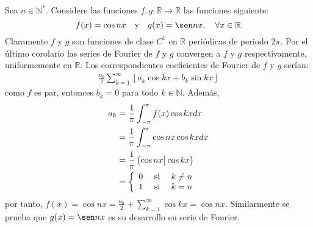 \documentclass[12pt]{report}
\theoremstyle{largebreak}
\newcommand\cf[3]{\ensuremath{#1:#2\rightarrow#3}}
\newcommand\pint[2]{\ensuremath{\left(#1\big| #2\right)}}
\begin{document}
    \begin{exa}
        Sea $n\in\mathbb{N}^*$. Considere las funciones $\cf{f,g}{\mathbb{R}}{\mathbb{R}}$ las funciones siguiente:
        \begin{equation*}
            f(x)=\cos nx\quad\textup{y}\quad g(x)=\sen nx,\quad\forall x\in\mathbb{R}
        \end{equation*}
        Claramente $f$ y $g$ son funciones de clase $C^1$ en $\mathbb{R}$ periódicas de periodo $2\pi$. Por el último corolario las series de Fourier de $f$ y $g$ convergen a $f$ y $g$ respectivamente, uniformemente en $\mathbb{R}$. Los correspondientes coeficientes de Fourier de $f$ y $g$ serían:
        \begin{equation*}
            \begin{split}
                \frac{a_0}{2}\sum_{ k=1}^\infty\left[a_k\cos kx+b_k\sin kx \right]
            \end{split}
        \end{equation*}
        como $f$ es par, entonces $b_k=0$ para todo $k\in\mathbb{N}$. Además,
        \begin{equation*}
            \begin{split}
                a_k&=\frac{1}{\pi}\int_{-\pi}^{\pi}f(x)\cos kxdx\\
                &=\frac{1}{\pi}\int_{-\pi}^{\pi}\cos nx \cos kxdx\\
                &=\frac{1}{\pi}\pint{\cos nx}{\cos kx}\\
                &=\left\{
                    \begin{array}{lcr}
                       0 & \textup{ si } & k\neq n\\
                       1 & \textup{ si } & k=n\\ 
                    \end{array}
                \right. \\
            \end{split}
        \end{equation*}
        por tanto, $f(x)=\cos nx=\frac{a_0}{2}+\sum_{ k=1}^\infty \cos kx=\cos nx$. Similarmente se prueba que $g(x)=\sen nx$ es su desarrollo en serie de Fourier.
    \end{exa}
\end{document}
